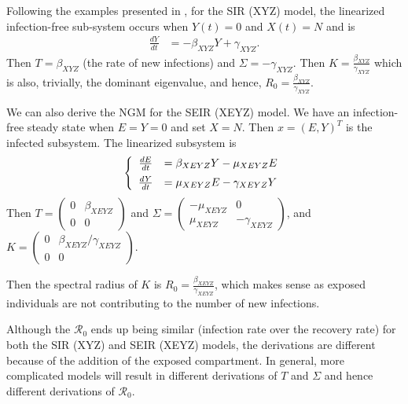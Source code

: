 \documentclass[12pt]{article}
\newcommand{\rr}{\ensuremath{\mathcal{R}_0}}
\begin{document}
Following the examples presented in \cite{diekmann1990}, for the SIR (XYZ) model, the linearized infection-free sub-system occurs when $Y(t)=0$ and $X(t)=N$ and is
\begin{align*}
\frac{dY}{dt} &= - \beta_{XYZ} Y + \gamma_{XYZ} .
  \end{align*}
  Then $T= \beta_{XYZ}$ (the rate of new infections) and $\Sigma = -\gamma_{XYZ}$.  Then $K = \frac{\beta_{XYZ}}{\gamma_{XYZ}}$ which is also, trivially, the dominant eigenvalue, and hence, $R_0 = \frac{\beta_{XYZ}}{\gamma_{XYZ}}$.

We can also derive the NGM for the SEIR (XEYZ) model.  We have an infection-free steady state when $E=Y=0$ and set $X=N$.  Then $x = (E, Y)^T$ is the infected subsystem.  The linearized subsystem is
  \begin{align*}
  \left \{
  \begin{array}{cl}
    \frac{dE}{dt} &= \beta_{XEYZ} Y  - \mu_{XEYZ} E\vspace{.5em}\\
    \frac{dY}{dt} &=  \mu_{XEYZ} E  - \gamma_{XEYZ} Y \\
  \end{array}
  \right .
  \end{align*}
  Then $T = \left ( \begin{array}{cc} 0 & \beta_{XEYZ} \\ 0 & 0  \end{array} \right )$ and $\Sigma = \left ( \begin{array}{cc} -\mu_{XEYZ} & 0 \\ \mu_{XEYZ} & - \gamma_{XEYZ} \end{array} \right )$, and $K =\left ( \begin{array}{cc} 0& \beta_{XEYZ} / \gamma_{XEYZ} \\ 0 & 0 \end{array} \right  )$.

  Then the spectral radius of $K$ is $R_0  = \frac{\beta_{XEYZ}}{\gamma_{XEYZ}}$, which makes sense as exposed individuals are not contributing to the number of new infections.

  Although the $\rr$ ends up being similar (infection rate over the recovery rate) for both the SIR (XYZ) and SEIR (XEYZ) models, the derivations are different because of the addition of the exposed compartment.  In general, more complicated models will result in different derivations of $T$ and $\Sigma$ and hence different derivations of $\rr$.
\end{document}

